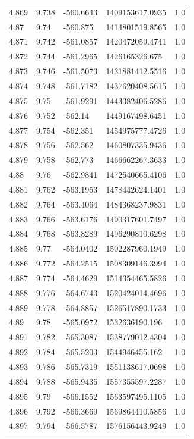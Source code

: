 \begin{tabular}{lllll}
4.869 & 9.738 & -560.6643 & 1409153617.0935 & 1.0 \\
4.87 & 9.74 & -560.875 & 1414801519.8565 & 1.0 \\
4.871 & 9.742 & -561.0857 & 1420472059.4741 & 1.0 \\
4.872 & 9.744 & -561.2965 & 1426165326.675 & 1.0 \\
4.873 & 9.746 & -561.5073 & 1431881412.5516 & 1.0 \\
4.874 & 9.748 & -561.7182 & 1437620408.5615 & 1.0 \\
4.875 & 9.75 & -561.9291 & 1443382406.5286 & 1.0 \\
4.876 & 9.752 & -562.14 & 1449167498.6451 & 1.0 \\
4.877 & 9.754 & -562.351 & 1454975777.4726 & 1.0 \\
4.878 & 9.756 & -562.562 & 1460807335.9436 & 1.0 \\
4.879 & 9.758 & -562.773 & 1466662267.3633 & 1.0 \\
4.88 & 9.76 & -562.9841 & 1472540665.4106 & 1.0 \\
4.881 & 9.762 & -563.1953 & 1478442624.1401 & 1.0 \\
4.882 & 9.764 & -563.4064 & 1484368237.9831 & 1.0 \\
4.883 & 9.766 & -563.6176 & 1490317601.7497 & 1.0 \\
4.884 & 9.768 & -563.8289 & 1496290810.6298 & 1.0 \\
4.885 & 9.77 & -564.0402 & 1502287960.1949 & 1.0 \\
4.886 & 9.772 & -564.2515 & 1508309146.3994 & 1.0 \\
4.887 & 9.774 & -564.4629 & 1514354465.5826 & 1.0 \\
4.888 & 9.776 & -564.6743 & 1520424014.4696 & 1.0 \\
4.889 & 9.778 & -564.8857 & 1526517890.1733 & 1.0 \\
4.89 & 9.78 & -565.0972 & 1532636190.196 & 1.0 \\
4.891 & 9.782 & -565.3087 & 1538779012.4304 & 1.0 \\
4.892 & 9.784 & -565.5203 & 1544946455.162 & 1.0 \\
4.893 & 9.786 & -565.7319 & 1551138617.0698 & 1.0 \\
4.894 & 9.788 & -565.9435 & 1557355597.2287 & 1.0 \\
4.895 & 9.79 & -566.1552 & 1563597495.1105 & 1.0 \\
4.896 & 9.792 & -566.3669 & 1569864410.5856 & 1.0 \\
4.897 & 9.794 & -566.5787 & 1576156443.9249 & 1.0 \\

\end{tabular}
